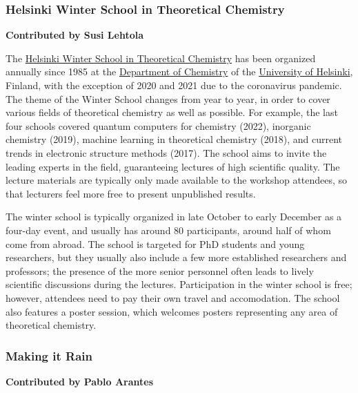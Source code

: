 \documentclass[9pt,review]{livecoms}
\begin{document}
\subsubsection{Helsinki Winter School in Theoretical Chemistry}

\textbf{Contributed by Susi Lehtola}

The \href{http://www.chem.helsinki.fi/ws.html}{Helsinki Winter School in
Theoretical Chemistry} has been organized annually
since 1985 at the \href{http://www.chem.helsinki.fi/}{Department of Chemistry}
of the \href{www.helsinki.fi/}{University of Helsinki}, Finland, with the
exception of 2020 and 2021 due to the coronavirus pandemic. The theme of the
Winter School changes from year to year, in order to cover various fields of
theoretical chemistry as well as possible. For example, the last four schools
covered quantum computers for chemistry (2022), inorganic chemistry (2019),
machine learning in theoretical chemistry (2018), and current trends in
electronic structure methods (2017). The school aims to invite the leading 
experts in the field, guaranteeing lectures of high scientific quality. The
lecture materials are typically only made available to the workshop attendees,
so that lecturers feel more free to present unpublished results.

The winter school is typically organized in late October to early December as a
four-day event, and usually has around 80 participants, around half of whom come
from abroad. The school is targeted for PhD students and young researchers, but
they usually also include a few more established researchers and professors; the
presence of the more senior personnel often leads to lively scientific
discussions during the lectures. Participation in the winter school is free;
however, attendees need to pay their own travel and accomodation. The school
also features a poster session, which welcomes posters representing any area of
theoretical chemistry.

\subsubsection{Making it Rain}

\textbf{Contributed by Pablo Arantes}
\end{document}
